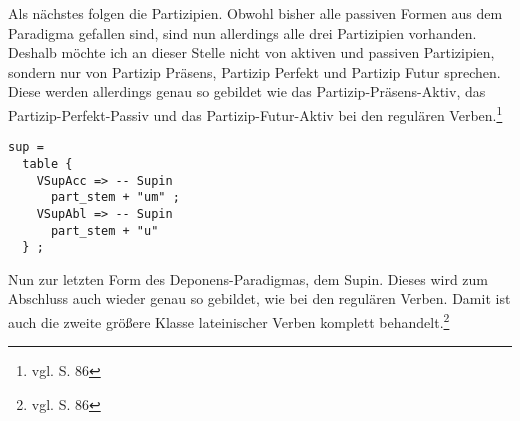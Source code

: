 Als nächstes folgen die Partizipien. Obwohl bisher alle passiven Formen aus dem Paradigma gefallen sind, sind nun allerdings alle drei Partizipien vorhanden. Deshalb möchte ich an dieser Stelle nicht von aktiven und passiven Partizipien, sondern nur von Partizip Präsens, Partizip Perfekt und Partizip Futur sprechen. Diese werden allerdings genau so gebildet wie das Partizip-Präsens-Aktiv, das Partizip-Perfekt-Passiv und das Partizip-Futur-Aktiv bei den regulären Verben.\footnote{vgl. \cite{BAYER-LINDAUER1994} S. 86} \par
\begin{lstlisting}[float=h!tp,caption={Ausschnitt aus der Funktion \texttt{mkDeponent} um Supin-Verbformen zu bilden (vgl. \textbf{ResLat.gf})},label={GF-Res-MkDeponent-Sup},basicstyle=\small]
sup = 
  table {
    VSupAcc => -- Supin
      part_stem + "um" ;
    VSupAbl => -- Supin
      part_stem + "u" 
  } ;
\end{lstlisting}
Nun zur letzten Form des Deponens-Paradigmas, dem Supin. Dieses wird zum Abschluss auch wieder genau so gebildet, wie bei den regulären Verben. Damit ist auch die zweite größere Klasse lateinischer Verben komplett behandelt.\footnote{vgl. \cite{BAYER-LINDAUER1994} S. 86}
\FloatBarrier
